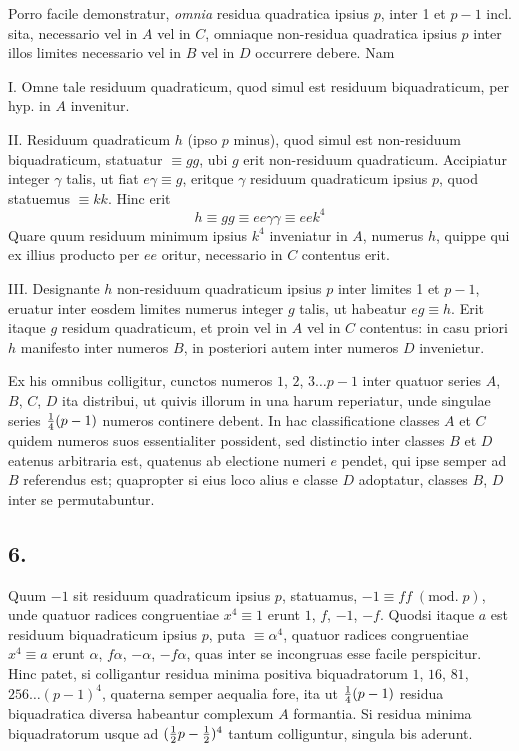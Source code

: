 \documentclass[twoside,12pt]{memoir}
\renewcommand{\pmod}[1]{\;(\textrm{mod.}\;#1)}
\let\oldfrac\frac
\def\frac#1#2{\mathchoice{\tfrac{#1}{#2}}{\oldfrac{#1}{#2}}{\genfrac{}{}{}{2}{#1}{#2\mathstrut}}{\genfrac{}{}{}{3}{#1}{#2\mathstrut}}}
\begin{document}
Porro facile demonstratur, \textit{omnia} residua quadratica ipsius \(p\), inter 1 et \(p-1\) incl. sita, necessario vel in \(A\) vel in \(C\), omniaque non-residua quadratica ipsius \(p\) inter illos limites necessario vel in \(B\) vel in \(D\) occurrere debere. Nam
 
I. Omne tale residuum quadraticum, quod simul est residuum biquadraticum, per hyp. in \(A\) invenitur.
 
II. Residuum quadraticum \(h\) (ipso \(p\) minus), quod simul est non-residuum biquadraticum, statuatur \(\equiv g g\), ubi \(g\) erit non-residuum quadraticum. Accipiatur integer \(\gamma\) talis, ut fiat \(e \gamma \equiv g\), eritque \(\gamma\) residuum quadraticum ipsius \(p\), quod statuemus \(\equiv k k\). Hinc erit
\[h \equiv g g \equiv e e \gamma \gamma \equiv e e k^{4}\]
Quare quum residuum minimum ipsius \(k^{4}\) inveniatur in \(A\), numerus \(h\), quippe qui ex illius producto per \(e e\) oritur, necessario in \(C\) contentus erit.
 
III. Designante \(h\) non-residuum quadraticum ipsius \(p\) inter limites 1 et \(p-1\), eruatur inter eosdem limites numerus integer \(g\) talis, ut habeatur \(e g \equiv h\). Erit itaque \(g\) residum quadraticum, et proin vel in \(A\) vel in \(C\) contentus: in casu priori \(h\) manifesto inter numeros \(B\), in posteriori autem inter numeros \(D\) invenietur.

Ex his omnibus colligitur, cunctos numeros \(1\), \(2\), \(3 \ldots p-1\) inter quatuor series \(A\), \(B\), \(C\), \(D\) ita distribui, ut quivis illorum in una harum reperiatur, unde singulae series \(\frac{1}{4}(p-1)\) numeros continere debent. In hac classificatione classes \(A\) et \(C\) quidem numeros suos essentialiter possident, sed distinctio inter classes \(B\) et \(D\) eatenus arbitraria est, quatenus ab electione numeri \(e\) pendet, qui ipse semper ad \(B\) referendus est; quapropter si eius loco alius e classe \(D\) adoptatur, classes \(B\), \(D\) inter se permutabuntur.

\subsection*{6.}
 
Quum \(-1\) sit residuum quadraticum ipsius \(p\), statuamus, \(-1 \equiv f f\pmod{p}\), unde quatuor radices congruentiae \(x^{4} \equiv 1\) erunt \(1\), \(f\), \(-1\), \(-f\). Quodsi itaque \pagebreak%
\(a\) est residuum biquadraticum ipsius \(p\), puta \(\equiv \alpha^{4}\), quatuor radices congruentiae \(x^{4} \equiv a\) erunt \(\alpha\), \(f \alpha\), \(-\alpha\), \(-f \alpha\), quas inter se incongruas esse facile perspicitur. Hinc patet, si colligantur residua minima positiva biquadratorum \(1\), \(16\), \(81\), \(256 \ldots (p-1)^{4}\), quaterna semper aequalia fore, ita ut \(\frac{1}{4}(p-1)\) residua biquadratica diversa habeantur complexum \(A\) formantia. Si residua minima biquadratorum usque ad \((\frac{1}{2} p-\frac{1}{2})^{4}\) tantum colliguntur, singula bis aderunt.
\end{document}
